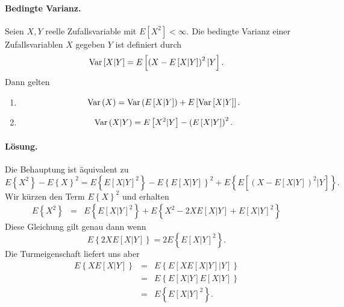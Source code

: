 \paragraph{Bedingte Varianz. } Seien $X,Y$ reelle Zufallsvariable mit $E\left[ X^2 \right] <\infty$. 
Die bedingte Varianz einer Zufallsvariablen $X$ gegeben $Y$ ist definiert durch
\begin{equation}
	\operatorname{Var} \left[ X|Y \right] = E \left[ \left( X - E\left[ X|Y \right] \right)^2|Y \right].
\end{equation}
Dann gelten
\begin{enumerate}
    \item 
        \begin{equation}
        \operatorname{Var} \left( X \right) = 
        \operatorname{Var} \left( E\left[ X|Y \right] \right) + E \left[ \operatorname{Var}\left[ X|Y \right] \right].
        \end{equation}
    \item \begin{equation}
            \operatorname{Var} \left( X | Y \right) = E \left[ X^2 | Y \right] 
            - \left( E\left[ X | Y \right] \right)^2.
        \end{equation}
\end{enumerate}

\paragraph*{Lösung. } 
Die Behauptung ist äquivalent zu 
\begin{equation}
    E\left\{ X^2 \right\} - E\left\{ X \right\}^2 
    = E\left\{ E\left[ X|Y \right]^2 \right\} - E\left\{ E\left[ X|Y \right] \right\}^2
    + E\left\{ E\left[ \left( X - E\left[ X|Y \right] \right)^2 |Y \right] \right\}.
\end{equation}
Wir kürzen den Term $E\left\{ X \right\}^2$ und erhalten 
\begin{eqnarray}
    E\left\{ X^2 \right\}&=& 
    E\left\{ E\left[ X|Y \right]^2 \right\} +
    E\left\{ X^2 - 2X E\left[ X|Y \right] + E\left[ X|Y \right]^2 \right\}
\end{eqnarray}
Diese Gleichung gilt genau dann wenn
\begin{equation}
    E\left\{  2X E\left[ X|Y \right] \right\} = 2 E\left\{ E\left[ X|Y \right]^2 \right\}.	
\end{equation}
Die Turmeigenschaft liefert uns aber
\begin{eqnarray}
    E\left\{  X E\left[ X|Y \right] \right\} &=& 
    E\left\{ E\left[ X E\left[ X|Y \right] | Y \right] \right\} \\
    &=& E\left\{ E\left[ X|Y \right] E\left[ X|Y \right]   \right\} \\
    &=& E\left\{ E\left[ X|Y \right]^2 \right\}.
\end{eqnarray}







